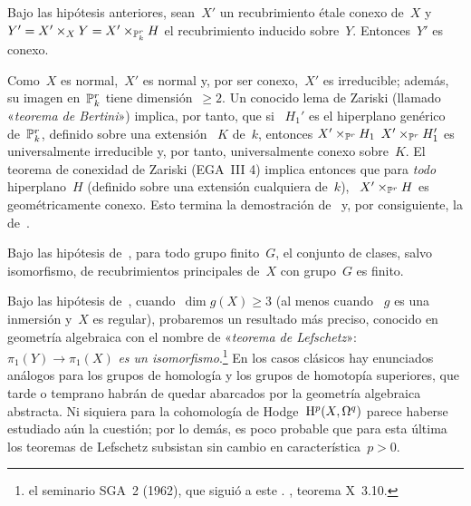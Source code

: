 \begin{corollaire}
\label{X.2.11}
Bajo las hipótesis anteriores, sean~$X'$ un recubrimiento étale conexo de~$X$ y
~$Y'=X'\times_XY=X'\times_{\mathbb P_k^r}H$ el recubrimiento inducido sobre~$Y$.
Entonces~$Y'$ es conexo.
\end{corollaire}

Como~$X$ es normal,~$X'$ es normal y, por ser conexo,~$X'$ es irreducible;
además, su imagen en~$\mathbb P_k^r$ tiene dimensión~$\ge 2$. Un conocido lema de
Zariski (llamado «\emph{teorema de Bertini}») implica, por tanto, que si
~$H_1'$ es el hiperplano genérico de~$\mathbb P_k^r$, definido sobre una extensión
~$K$ de~$k$, entonces
{$X'\times_{\mathbb P^r}H_1$}
{$X'\times_{\mathbb P^r}H_1'$}
es universalmente irreducible y, por tanto, universalmente conexo sobre~$K$.
El teorema de conexidad de Zariski (EGA~III 4) implica entonces que para
\emph{todo} hiperplano~$H$ (definido sobre una extensión cualquiera de~$k$),
~$X'\times_{\mathbb P^r}H$ es geométricamente conexo. Esto termina la demostración
de~ y, por consiguiente, la de~.

\begin{corollaire}
\label{X.2.12}
Bajo
las hipótesis de~, para todo grupo finito~$G$, el conjunto de clases,
salvo isomorfismo, de recubrimientos principales de~$X$ con grupo~$G$ es finito.
\end{corollaire}

\begin{remarque}
\label{X.2.13}
Bajo las hipótesis de~, cuando~$\dim g(X)\ge 3$ (al menos cuando
~$g$ es una inmersión y~$X$ es regular), probaremos un resultado más preciso,
conocido en geometría algebraica con el nombre de «\emph{teorema de Lefschetz}»:
~$\pi_1(Y)\to\pi_1(X)$ \emph{es un isomorfismo}.\footnote{\Cf el seminario
SGA~2 (1962), que siguió a este%
{.}
{, teorema X~3.10.}}
En los casos clásicos hay enunciados análogos para los grupos de homología y
los grupos de homotopía superiores, que tarde o temprano habrán de quedar
abarcados por la geometría algebraica abstracta. Ni siquiera para la
cohomología de Hodge~$\mathrm H^p(X,\Omega^q)$ parece haberse estudiado aún la
cuestión; por lo demás, es poco probable que para esta última los teoremas de
Lefschetz subsistan sin cambio en característica~$p>0$.
\end{remarque}

